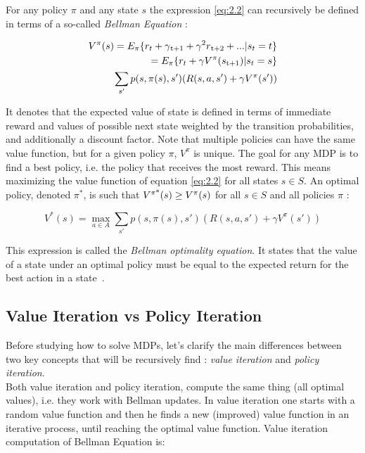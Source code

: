 For any policy $\pi$ and any state $s$ the expression \ref{eq:2.2} can recursively be defined in terms of a so-called \textit{Bellman Equation} :

\begin{equation}
\begin{split}
	V^\pi (s) = E_\pi\{r_t + \gamma\textsubscript{t+1} + \gamma^2 r\textsubscript{t+2} + ... | s_t = t\} \\
	= E_\pi \{r_t + \gamma V^\pi(s\textsubscript{t+1}) | s_t = s\} \\
	\sum_{s'}p(s, \pi(s), s') (R(s, a, s') + \gamma V^\pi (s'))
\end{split}	
\end{equation}

It denotes that the expected value of state is defined in terms of immediate reward and values of possible next state weighted by the transition probabilities, and additionally a discount factor. Note that multiple policies can have the same value function, but for a given policy $\pi$, $V^\pi$ is unique. The goal for any MDP is to find a best policy, i.e. the policy that receives the most reward. This means maximizing the value function of equation \ref{eq:2.2} for all states $s \in S$. An optimal policy, denoted $\pi^*$, is such that $V\textsuperscript{$\pi$*} (s) \geq V^\pi (s)$ for all $s \in S$ and all policies $\pi$ :

\begin{equation} 
\label{eq:2.5}
V^*(s) = \max_{a \in A} \sum_{s'}p(s, \pi(s), s') (R(s, a, s') + \gamma V^\pi (s'))
\end{equation}

This expression is called the \textit{Bellman optimality equation}. It states that the value of a state under an optimal policy must be equal to the expected return for the best action in a state~\cite{wiering2012reinforcement}.

\subsection{Value Iteration vs Policy Iteration} Before studying how to solve MDPs, let's clarify the main differences between two key concepts that will be recursively find : \textit{value iteration} and \textit{policy iteration}. \\

Both value iteration and policy iteration, compute the same thing (all optimal values), i.e. they work with Bellman updates. In value iteration one starts with a random value function and then he finds a new (improved) value function in an iterative process, until reaching the optimal value function. Value iteration computation of Bellman Equation is:

